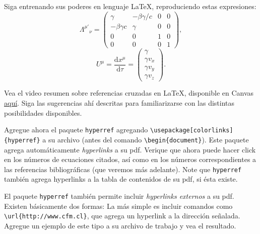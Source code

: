 \documentclass[11pt]{exam}
\begin{document}
\begin{questions}
\item Siga entrenando sus poderes en lenguaje \LaTeX, reproduciendo estas expresiones:
\begin{equation}
\Lambda^{\mu'}{}_\nu = \begin{pmatrix}
\gamma & -\beta\gamma/c & 0 & 0\\
-\beta\gamma c & \gamma & 0 & 0\\
0 & 0 & 1 & 0\\
0 & 0 & 0 & 1 \end{pmatrix},
\end{equation}
\begin{equation}
U^\mu = \frac{\text{d}x^\mu}{\text{d}\tau} =
\begin{pmatrix} \gamma \\ \gamma v_x \\ \gamma v_y \\ \gamma v_z \end{pmatrix}.
\end{equation}


\item Vea el video resumen sobre referencias cruzadas en \LaTeX, disponible en Canvas \href{https://udec.instructure.com/courses/51022/pages/referencias-cruzadas?module_item_id=1904618}{aquí}. Siga las sugerencias ahí descritas para familiarizarse con las distintas posibilidades disponibles.

\item Agregue ahora el paquete \texttt{hyperref} agregando 
\verb|\usepackage[colorlinks]{hyperref}| a su archivo (antes del comando \verb|\begin{document}|). Este paquete agrega automáticamente \textit{hyperlinks} a su pdf. Verique que ahora puede hacer click en los números de ecuaciones citados, así como en los números correspondientes a las referencias bibliográficas (que veremos más adelante). Note que \texttt{hyperref} también agrega hyperlinks a la tabla de contenidos de su pdf, si ésta existe.

\item El paquete \texttt{hyperref} también permite incluir \textit{hyperlinks externos} a su pdf. Existen básicamente dos formas: La más simple es incluir comandos como \verb|\url{http://www.cfm.cl}|, que agrega un hyperlink a la dirección señalada. Agregue un ejemplo de este tipo a su archivo de trabajo y vea el resultado.


\end{questions}
\end{document}
